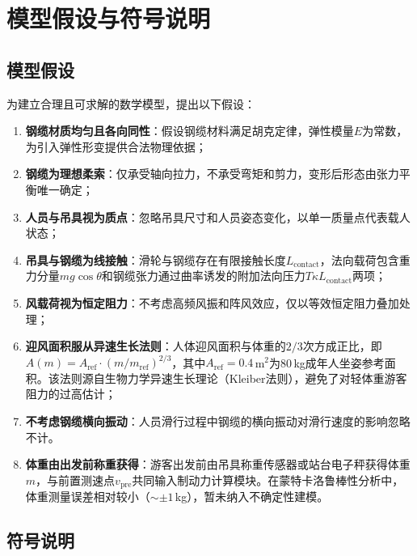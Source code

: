\documentclass[12pt,a4paper]{ctexart}
\begin{document}
\section{模型假设与符号说明}

\subsection{模型假设}

为建立合理且可求解的数学模型，提出以下假设：

\begin{enumerate}[label=(\arabic*),leftmargin=2em]
  \item \textbf{钢缆材质均匀且各向同性}：假设钢缆材料满足胡克定律，弹性模量$E$为常数，为引入弹性形变提供合法物理依据；
  \item \textbf{钢缆为理想柔索}：仅承受轴向拉力，不承受弯矩和剪力，变形后形态由张力平衡唯一确定；
  \item \textbf{人员与吊具视为质点}：忽略吊具尺寸和人员姿态变化，以单一质量点代表载人状态；
  \item \textbf{吊具与钢缆为线接触}：滑轮与钢缆存在有限接触长度$L_{\text{contact}}$，法向载荷包含重力分量$mg\cos\theta$和钢缆张力通过曲率诱发的附加法向压力$T\kappa L_{\text{contact}}$两项；
  \item \textbf{风载荷视为恒定阻力}：不考虑高频风振和阵风效应，仅以等效恒定阻力叠加处理；
  \item \textbf{迎风面积服从异速生长法则}：人体迎风面积与体重的$2/3$次方成正比，即$A(m) = A_{\text{ref}} \cdot (m/m_{\text{ref}})^{2/3}$，其中$A_{\text{ref}} = 0.4$\,m$^2$为80\,kg成年人坐姿参考面积。该法则源自生物力学异速生长理论（Kleiber法则\cite{kleiber1947}），避免了对轻体重游客阻力的过高估计；
  \item \textbf{不考虑钢缆横向振动}：人员滑行过程中钢缆的横向振动对滑行速度的影响忽略不计。
  \item \textbf{体重由出发前称重获得}：游客出发前由吊具称重传感器或站台电子秤获得体重$m$，与前置测速点$v_{\text{pre}}$共同输入制动力计算模块。在蒙特卡洛鲁棒性分析中，体重测量误差相对较小（$\sim\pm1$\,kg），暂未纳入不确定性建模。
\end{enumerate}

\subsection{符号说明}
\end{document}
